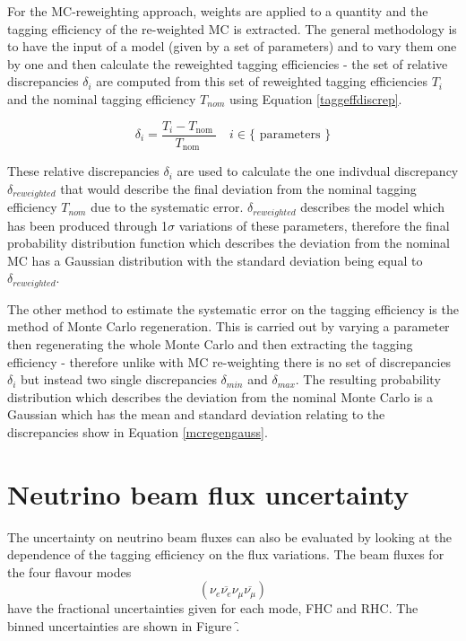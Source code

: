 \documentclass{article}
\begin{document}
For the MC-reweighting approach, weights are applied to a quantity and the tagging efficiency of the re-weighted MC is extracted. The general methodology is to have the input of a model (given by a set of parameters) and to vary them one by one and then calculate the reweighted tagging efficiencies - the set of relative discrepancies $\delta_{i}$ are computed from this set of reweighted tagging efficiencies $T_{i}$ and the nominal tagging efficiency $T_{nom}$ using Equation \eqref{taggeffdiscrep}.

\begin{equation}
\delta_{i}=\frac{T_{i}-T_{\text {nom }}}{T_{\text {nom }}} \quad i \in\{\text { parameters }\}
\label{tageffdiscrep}
\end{equation}

These relative discrepancies $\delta_{i}$ are used to calculate the one indivdual discrepancy $\delta_{reweighted}$ that would describe the final deviation from the nominal tagging efficiency $T_{nom}$ due to the systematic error. $\delta_{reweighted}$ describes the model which has been produced through 1$\sigma$ variations of these parameters, therefore the final probability distribution function which describes the deviation from the nominal MC has a Gaussian distribution with the standard deviation being equal to $\delta_{reweighted}$. 

The other method to estimate the systematic error on the tagging efficiency is the method of Monte Carlo regeneration. This is carried out by varying a parameter then regenerating the whole Monte Carlo and then extracting the tagging efficiency - therefore unlike with MC re-weighting there is no set of discrepancies $\delta_{i}$ but instead two single discrepancies $\delta_{min}$ and $\delta_{max}$. The resulting probability distribution which describes the deviation from the nominal Monte Carlo is a Gaussian which has the mean and standard deviation relating to the discrepancies show in Equation \eqref{mcregengauss}.





\section{Neutrino beam flux uncertainty}

The uncertainty on neutrino beam fluxes can also be evaluated by looking at the dependence of the tagging efficiency on the flux variations. The beam fluxes for the four flavour modes 
$$\left(\nu_{e} \overline{\nu_{e}} \nu_{\mu} \overline{\nu_{\mu}}\right)$$ have the fractional uncertainties given for each mode, FHC and RHC. The binned uncertainties are shown in Figure \f.
\end{document}
